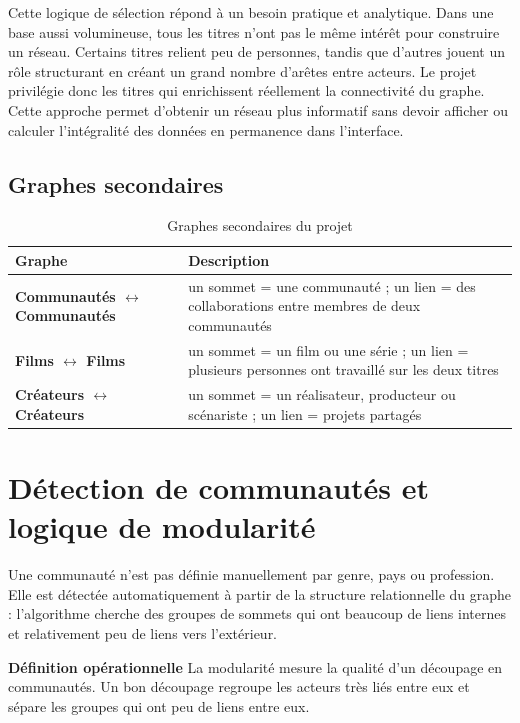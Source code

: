 \documentclass[a4paper,12pt]{article}
\begin{document}
Cette logique de sélection répond à un besoin pratique et analytique. Dans une base aussi volumineuse, tous les titres n'ont pas le même intérêt pour construire un réseau. Certains titres relient peu de personnes, tandis que d'autres jouent un rôle structurant en créant un grand nombre d'arêtes entre acteurs. Le projet privilégie donc les titres qui enrichissent réellement la connectivité du graphe. Cette approche permet d'obtenir un réseau plus informatif sans devoir afficher ou calculer l'intégralité des données en permanence dans l'interface.

\subsection{Graphes secondaires}

\begin{table}[H]
\centering
\small
\begin{tabularx}{\linewidth}{>{\bfseries}l X}
\toprule
\rowcolor{imdblight}
Graphe & Description \\
\midrule
Communautés $\leftrightarrow$ Communautés & un sommet = une communauté ; un lien = des collaborations entre membres de deux communautés \\
Films $\leftrightarrow$ Films & un sommet = un film ou une série ; un lien = plusieurs personnes ont travaillé sur les deux titres \\
Créateurs $\leftrightarrow$ Créateurs & un sommet = un réalisateur, producteur ou scénariste ; un lien = projets partagés \\
\bottomrule
\end{tabularx}
\caption{Graphes secondaires du projet}
\end{table}

\section{Détection de communautés et logique de modularité}

Une communauté n'est pas définie manuellement par genre, pays ou profession. Elle est détectée automatiquement à partir de la structure relationnelle du graphe : l'algorithme cherche des groupes de sommets qui ont beaucoup de liens internes et relativement peu de liens vers l'extérieur.

\begin{tcolorbox}[greenbox]
\textbf{Définition opérationnelle}
La modularité mesure la qualité d'un découpage en communautés. Un bon découpage regroupe les acteurs très liés entre eux et sépare les groupes qui ont peu de liens entre eux.
\end{tcolorbox}
\end{document}

